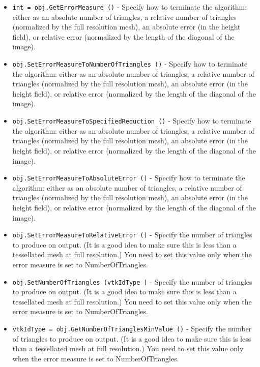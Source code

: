 \begin{itemize}
\item  \verb|int = obj.GetErrorMeasure ()| -  Specify how to terminate the algorithm: either as an absolute number of
 triangles, a relative number of triangles (normalized by the full
 resolution mesh), an absolute error (in the height field), or relative
 error (normalized by the length of the diagonal of the image).

\item  \verb|obj.SetErrorMeasureToNumberOfTriangles ()| -  Specify how to terminate the algorithm: either as an absolute number of
 triangles, a relative number of triangles (normalized by the full
 resolution mesh), an absolute error (in the height field), or relative
 error (normalized by the length of the diagonal of the image).

\item  \verb|obj.SetErrorMeasureToSpecifiedReduction ()| -  Specify how to terminate the algorithm: either as an absolute number of
 triangles, a relative number of triangles (normalized by the full
 resolution mesh), an absolute error (in the height field), or relative
 error (normalized by the length of the diagonal of the image).

\item  \verb|obj.SetErrorMeasureToAbsoluteError ()| -  Specify how to terminate the algorithm: either as an absolute number of
 triangles, a relative number of triangles (normalized by the full
 resolution mesh), an absolute error (in the height field), or relative
 error (normalized by the length of the diagonal of the image).

\item  \verb|obj.SetErrorMeasureToRelativeError ()| -  Specify the number of triangles to produce on output. (It is a
 good idea to make sure this is less than a tessellated mesh
 at full resolution.) You need to set this value only when
 the error measure is set to NumberOfTriangles.

\item  \verb|obj.SetNumberOfTriangles (vtkIdType )| -  Specify the number of triangles to produce on output. (It is a
 good idea to make sure this is less than a tessellated mesh
 at full resolution.) You need to set this value only when
 the error measure is set to NumberOfTriangles.

\item  \verb|vtkIdType = obj.GetNumberOfTrianglesMinValue ()| -  Specify the number of triangles to produce on output. (It is a
 good idea to make sure this is less than a tessellated mesh
 at full resolution.) You need to set this value only when
 the error measure is set to NumberOfTriangles.


\end{itemize}
